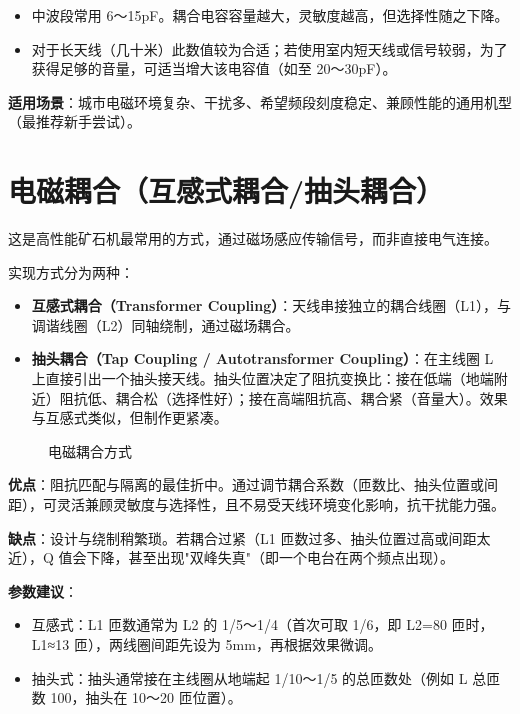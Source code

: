 \documentclass[12pt,UTF8]{ctexbook}
\begin{document}
\begin{itemize}[leftmargin=2cm]
	\item 中波段常用 6～15pF。耦合电容容量越大，灵敏度越高，但选择性随之下降。
	\item 对于长天线（几十米）此数值较为合适；若使用室内短天线或信号较弱，为了获得足够的音量，可适当增大该电容值（如至 20～30pF）。
\end{itemize}

\textbf{适用场景}：城市电磁环境复杂、干扰多、希望频段刻度稳定、兼顾性能的通用机型（最推荐新手尝试）。

\section{电磁耦合（互感式耦合/抽头耦合）}

这是高性能矿石机最常用的方式，通过磁场感应传输信号，而非直接电气连接。

实现方式分为两种：

\begin{itemize}[leftmargin=2cm]
	\item \textbf{互感式耦合（Transformer Coupling）}：天线串接独立的耦合线圈（L1），与调谐线圈（L2）同轴绕制，通过磁场耦合。
	\item \textbf{抽头耦合（Tap Coupling / Autotransformer Coupling）}：在主线圈 L 上直接引出一个抽头接天线。抽头位置决定了阻抗变换比：接在低端（地端附近）阻抗低、耦合松（选择性好）；接在高端阻抗高、耦合紧（音量大）。效果与互感式类似，但制作更紧凑。
\end{itemize}

\begin{figure}[H]
	\centering
	\caption{电磁耦合方式}
	\label{fig:electromagnetic-coupling}
\end{figure}

\textbf{优点}：阻抗匹配与隔离的最佳折中。通过调节耦合系数（匝数比、抽头位置或间距），可灵活兼顾灵敏度与选择性，且不易受天线环境变化影响，抗干扰能力强。

\textbf{缺点}：设计与绕制稍繁琐。若耦合过紧（L1 匝数过多、抽头位置过高或间距太近），Q 值会下降，甚至出现"双峰失真"（即一个电台在两个频点出现）。

\textbf{参数建议}：

\begin{itemize}[leftmargin=2cm]
	\item 互感式：L1 匝数通常为 L2 的 1/5～1/4（首次可取 1/6，即 L2=80 匝时，L1≈13 匝），两线圈间距先设为 5mm，再根据效果微调。
	\item 抽头式：抽头通常接在主线圈从地端起 1/10～1/5 的总匝数处（例如 L 总匝数 100，抽头在 10～20 匝位置）。
\end{itemize}
\end{document}
